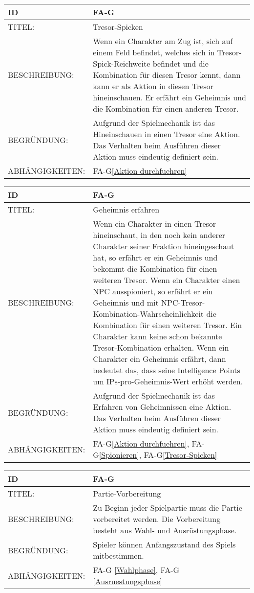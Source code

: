 \begin{tabularx}{16cm}{l|X}
	{table}\label{Tresor-Spicken}
	\textbf{ID} & \textbf{FA-G\arabic{table}} \\
	\hline
	TITEL: & Tresor-Spicken \\
	\hline
	BESCHREIBUNG: & Wenn ein Charakter am Zug ist, sich auf einem Feld befindet, welches sich in Tresor-Spick-Reichweite befindet und die Kombination für diesen Tresor kennt, dann kann er als Aktion in diesen Tresor hineinschauen. Er erfährt ein Geheimnis und die Kombination für einen anderen Tresor.\\
	 
	\hline
	BEGRÜNDUNG: & Aufgrund der Spielmechanik ist das Hineinschauen in einen Tresor eine Aktion. Das Verhalten beim Ausführen dieser Aktion muss eindeutig definiert sein.\\
	\hline
	ABHÄNGIGKEITEN: & FA-G\ref{Aktion durchfuehren}  \\
\end{tabularx}

\begin{tabularx}{16cm}{l|X}
	{table}\label{Geheimnis erhalten}
	\textbf{ID} & \textbf{FA-G\arabic{table}} \\
	\hline
	TITEL: & Geheimnis erfahren \\
	\hline
	BESCHREIBUNG: & Wenn ein Charakter in einen Tresor hineinschaut, in den noch kein anderer Charakter seiner Fraktion hineingeschaut hat, so erfährt er ein Geheimnis und bekommt die Kombination für einen weiteren Tresor. Wenn ein Charakter einen NPC ausspioniert, so erfährt er ein Geheimnis und mit NPC-Tresor-Kombination-Wahrscheinlichkeit die Kombination für einen weiteren Tresor. Ein Charakter kann keine schon bekannte Tresor-Kombination erhalten. Wenn ein Charakter ein Geheimnis erfährt, dann bedeutet das, dass seine Intelligence Points um IPs-pro-Geheimnis-Wert erhöht werden. \\
	 
	\hline
	BEGRÜNDUNG: & Aufgrund der Spielmechanik ist das Erfahren von Geheimnissen eine Aktion. Das Verhalten beim Ausführen dieser Aktion muss eindeutig definiert sein.\\
	\hline

	ABHÄNGIGKEITEN: & FA-G\ref{Aktion durchfuehren}, FA-G\ref{Spionieren}, FA-G\ref{Tresor-Spicken} \\
\end{tabularx}


\begin{tabularx}{16cm}{l|X}
	{table}\label{Partie-Vorbereitung}
	\textbf{ID} & \textbf{FA-G \arabic{table}} \\
	\hline
	TITEL: & Partie-Vorbereitung \\
	\hline
	BESCHREIBUNG: & Zu Beginn jeder Spielpartie muss die Partie vorbereitet werden. Die Vorbereitung besteht aus Wahl- und Ausrüstungsphase. \\
	\hline
	BEGRÜNDUNG: & Spieler können Anfangszustand des Spiels mitbestimmen. \\
	\hline
	ABHÄNGIGKEITEN: & FA-G \ref{Wahlphase}, FA-G \ref{Ausruestungsphase} \\
\end{tabularx}

